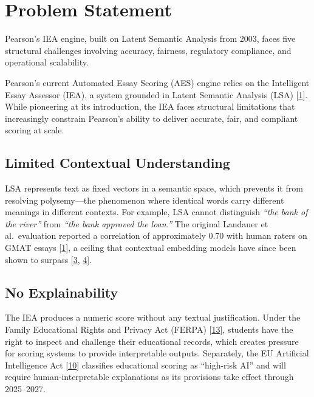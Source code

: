 \documentclass[12pt]{article}
\begin{document}
\vspace{8pt}

\tableofcontents

\newpage

\section{Problem Statement}

\begin{ataglance}
\singlespacing
Pearson's IEA engine, built on Latent Semantic Analysis from 2003, faces five structural challenges involving accuracy, fairness, regulatory compliance, and operational scalability.
\end{ataglance}

Pearson's current Automated Essay Scoring (AES) engine relies on the Intelligent Essay Assessor (IEA), a system grounded in Latent Semantic Analysis (LSA) [\hyperlink{ref1}{1}]. While pioneering at its introduction, the IEA faces structural limitations that increasingly constrain Pearson's ability to deliver accurate, fair, and compliant scoring at scale.

\subsection{Limited Contextual Understanding}

LSA represents text as fixed vectors in a semantic space, which prevents it from resolving polysemy---the phenomenon where identical words carry different meanings in different contexts. For example, LSA cannot distinguish \textit{``the bank of the river''} from \textit{``the bank approved the loan.''} The original Landauer et al.\ evaluation reported a correlation of approximately 0.70 with human raters on GMAT essays [\hyperlink{ref1}{1}], a ceiling that contextual embedding models have since been shown to surpass [\hyperlink{ref3}{3}, \hyperlink{ref4}{4}].

\subsection{No Explainability}

The IEA produces a numeric score without any textual justification. Under the Family Educational Rights and Privacy Act (FERPA) [\hyperlink{ref13}{13}], students have the right to inspect and challenge their educational records, which creates pressure for scoring systems to provide interpretable outputs. Separately, the EU Artificial Intelligence Act [\hyperlink{ref10}{10}] classifies educational scoring as ``high-risk AI'' and will require human-interpretable explanations as its provisions take effect through 2025--2027.
\end{document}
